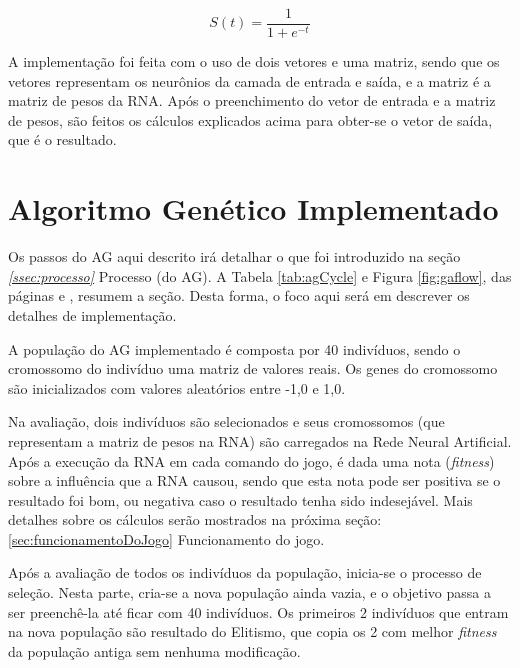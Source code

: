 \documentclass[
	12pt,					%
	openright,				%
	oneside,				%
	a4paper,				%
	bibjustif,				%
	chapter=TITLE,			%
	english,				%
	brazil,					%
	]{abntex2}
\begin{document}
	\begin{equation}
		S(t) = \frac{1}{1 + e^{-t}}
		\label{eq:sigmoid}
	\end{equation}
	
	\vspace{3mm}
	
	A implementação foi feita com o uso de dois vetores e uma matriz,
	sendo que os vetores representam os neurônios da camada de entrada e saída,
	e a matriz é a matriz de pesos da RNA.
	Após o preenchimento do vetor de entrada e a matriz de pesos,
	são feitos os cálculos explicados acima para obter-se o vetor de saída,
	que é o resultado.
	
	\FloatBarrier
	\section{Algoritmo Genético Implementado}
	Os passos do AG aqui descrito irá detalhar o que foi introduzido na seção \textit{\ref{ssec:processo}} Processo (do AG).
	A Tabela \ref{tab:agCycle} e Figura \ref{fig:gaflow},
	das páginas \pageref{tab:agCycle} e \pageref{fig:gaflow},
	resumem a seção.
	Desta forma, o foco aqui será em descrever os detalhes de implementação.
	
	A população do AG implementado é composta por 40 indivíduos,
	sendo o cromossomo do indivíduo uma matriz de valores reais.
	Os genes do cromossomo são inicializados com valores aleatórios entre -1,0 e 1,0.
	
	Na avaliação,
	dois indivíduos são selecionados e seus cromossomos
	(que representam a matriz de pesos na RNA)
	são carregados na Rede Neural Artificial.
	Após a execução da RNA em cada comando do jogo,
	é dada uma nota (\textit{fitness}) sobre a influência que a RNA causou,
	sendo que esta nota pode ser
	positiva se o resultado foi bom,
	ou negativa caso o resultado tenha sido indesejável.
	Mais detalhes sobre os cálculos serão mostrados na próxima seção:
	\ref{sec:funcionamentoDoJogo} Funcionamento do jogo.
	
	Após a avaliação de todos os indivíduos da população,
	inicia-se o processo de seleção.
	Nesta parte, cria-se a nova população ainda vazia,
	e o objetivo passa a ser preenchê-la até ficar com 40 indivíduos.
	Os primeiros 2 indivíduos que entram na nova população são resultado do Elitismo,
	que copia os 2 com melhor \textit{fitness} da população antiga sem nenhuma modificação.
	
\end{document}
